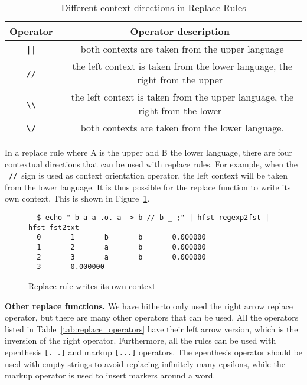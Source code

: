 \documentclass{llncs}
\begin{document}
\begin{table} [h!]
  \centering
  \caption{Different context directions in Replace Rules}
  \begin{tabular}{ c c }
    \hline
    Operator & Operator description \\ \hline
    \ \verb!||!\ & \ both contexts are taken from the upper language \\ 
    \ \verb!//!\ & \ the left context is taken from the lower language, the right from the upper \\ 
    \ \verb!\\!\ & \ the left context is taken from the upper language, the right from the lower \\ 
    \ \verb!\/!\ & \ both contexts are taken from the lower language. \\ \hline
  \end{tabular}
  \label{tab:context_directions}
\end{table}

In a replace rule where A is the upper and B the lower language, 
there are four contextual directions that can be used with replace rules.
For example, when the \ \verb!//!\ sign is used as context orientation operator, 
the left context will be taken from the lower language. 
It is thus possible for the replace function to write its own context. 
This is shown in Figure~\ref{fig:context_orientation}. 

\begin{figure} [h!]
{\footnotesize
\begin{verbatim}
  $ echo " b a a .o. a -> b // b _ ;" | hfst-regexp2fst | hfst-fst2txt
  0       1       b       b       0.000000
  1       2       a       b       0.000000
  2       3       a       b       0.000000
  3       0.000000
\end{verbatim}
}
\caption{Replace rule writes its own context}
\label{fig:context_orientation}
\end{figure}


\textbf{Other replace functions.} We have hitherto only used the right arrow replace operator,
but there are many other operators that can be used. 
All the operators listed in Table~\ref{tab:replace_operators} have their left arrow version, 
which is the inversion of the right operator. Furthermore, all the rules can be used 
with epenthesis \verb![. .]! and markup \verb![...]! operators. 
The epenthesis operator should be used with empty strings to avoid replacing infinitely 
many epsilons, while the markup operator is used to insert markers around a word.
\end{document}
